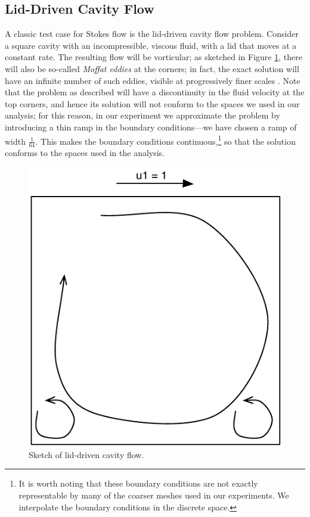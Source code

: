 \subsection{Lid-Driven Cavity Flow}
A classic test case for Stokes flow is the lid-driven cavity flow problem.  Consider a square cavity with an incompressible, viscous fluid, with a lid that moves at a constant rate.  The resulting flow will be vorticular; as sketched in Figure \ref{fig:cavity_flow_cartoon}, there will also be so-called \emph{Moffat eddies} at the corners; in fact, the exact solution  will have an infinite number of such eddies, visible at progressively finer scales \cite{Moffat}.  Note that the problem as described will have a discontinuity in the fluid velocity at the top corners, and hence its solution will not conform to the spaces we used in our analysis; for this reason, in our experiment we approximate the problem by introducing a thin ramp in the boundary conditions---we have chosen a ramp of width $\frac{1}{64}$.  This makes the boundary conditions continuous,\footnote{It is worth noting that these boundary conditions are not exactly representable by many of the coarser meshes used in our experiments.  We interpolate the boundary conditions in the discrete space.} so that the solution conforms to the spaces used in the analysis.
\begin{figure}[h!b!p!]
\centering
\includegraphics[scale=0.42]{./figures/cavity_flow_cartoon.pdf}
\caption{Sketch of lid-driven cavity flow.
}
\label{fig:cavity_flow_cartoon}
\end{figure}

